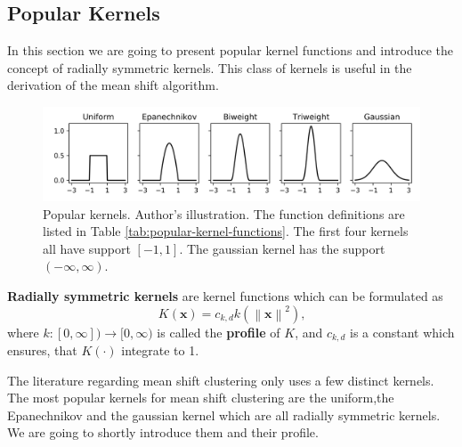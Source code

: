 \documentclass{article}
\newcommand{\norm}[1]{\left\lVert#1\right\rVert}
\begin{document}


\subsection{Popular Kernels} \label{sec:popular-kernels}

In this section we are going to present popular kernel functions and introduce the concept of radially symmetric kernels. This class of kernels is useful in the derivation of the mean shift algorithm.

\begin{figure}
	\centering
	\includegraphics[width=\textwidth]{figures/kde-popular-kernels}
	\caption[Popular kernels]{Popular kernels. Author's illustration. The function definitions are listed in Table \ref{tab:popular-kernel-functions}. The first four kernels all have support $[-1, 1]$. The gaussian kernel has the support $(-\infty, \infty)$.}
	\label{fig:kde-popular-kernels}
\end{figure}

\newpage
\textbf{Radially symmetric kernels} are kernel functions which can be formulated as
\begin{equation}
	K(\bm{x}) = c_{k,d} k(\norm{\bm{x}}^2)\text{,}
\end{equation}
where $k : [0, \infty]) \rightarrow [0, \infty)$ is called the \textbf{profile} of $K$, and $c_{k,d}$ is a constant which ensures, that $K(\cdot)$ integrate to 1.


The literature regarding mean shift clustering only uses a few distinct kernels. The most popular kernels for mean shift clustering are the uniform,the Epanechnikov and the gaussian kernel which are all radially symmetric kernels. We are going to shortly introduce them and their profile.
\end{document}
